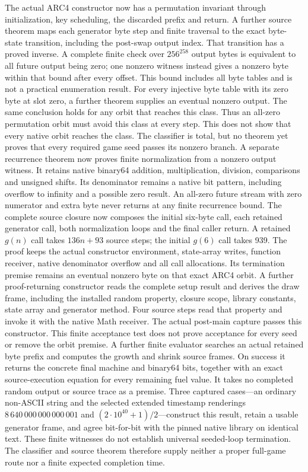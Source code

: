 \documentclass[11pt,a4paper]{article}
\numberwithin{equation}{section}
\theoremstyle{definition}
\theoremstyle{remark}
\begin{document}
The actual ARC4 constructor now has a permutation invariant through initialization, key scheduling, the discarded prefix and return. A further source theorem maps each generator byte step and finite traversal to the exact byte-state transition, including the post-swap output index. That transition has a proved inverse. A complete finite check over $256^{258}$ output bytes is equivalent to all future output being zero; one nonzero witness instead gives a nonzero byte within that bound after every offset. This bound includes all byte tables and is not a practical enumeration result. For every injective byte table with its zero byte at slot zero, a further theorem supplies an eventual nonzero output. The same conclusion holds for any orbit that reaches this class. Thus an all-zero permutation orbit must avoid this class at every step. This does not show that every native orbit reaches the class. The classifier is total, but no theorem yet proves that every required game seed passes its nonzero branch. A separate recurrence theorem now proves finite normalization from a nonzero output witness. It retains native binary64 addition, multiplication, division, comparisons and unsigned shifts. Its denominator remains a native bit pattern, including overflow to infinity and a possible zero result. An all-zero future stream with zero numerator and extra byte never returns at any finite recurrence bound. The complete source closure now composes the initial six-byte call, each retained generator call, both normalization loops and the final caller return. A retained $g(n)$ call takes $136n+93$ source steps; the initial $g(6)$ call takes 939. The proof keeps the actual constructor environment, state-array writes, function receiver, native denominator overflow and all call allocations. Its termination premise remains an eventual nonzero byte on that exact ARC4 orbit. A further proof-returning constructor reads the complete setup result and derives the draw frame, including the installed random property, closure scope, library constants, state array and generator method. Four source steps read that property and invoke it with the native Math receiver. The actual post-main capture passes this constructor. This finite acceptance test does not prove acceptance for every seed or remove the orbit premise. A further finite evaluator searches an actual retained byte prefix and computes the growth and shrink source frames. On success it returns the concrete final machine and binary64 bits, together with an exact source-execution equation for every remaining fuel value. It takes no completed random output or source trace as a premise. Three captured cases---an ordinary non-ASCII string and the selected extended timestamp renderings $8\,640\,000\,000\,000\,001$ and $(2\cdot10^{40}+1)/2$---construct this result, retain a usable generator frame, and agree bit-for-bit with the pinned native library on identical text. These finite witnesses do not establish universal seeded-loop termination. The classifier and source theorem therefore supply neither a proper full-game route nor a finite expected completion time.
\end{document}
